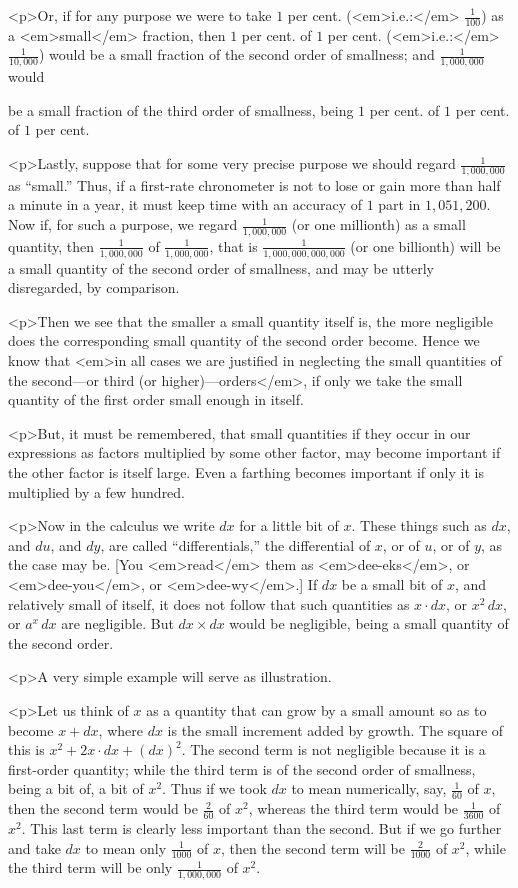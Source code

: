 \documentclass{ximera}
\begin{document}
<p>Or, if for any purpose we were to take $1$ per cent. (<em>i.e.:</em> $\frac{1}{100}$) as a <em>small</em> fraction, then $1$ per cent. of
$1$ per cent. (<em>i.e.:</em> $\frac{1}{10,000}$) would be a small fraction
of the second order of smallness; and $\frac{1}{1,000,000}$ would

be a small fraction of the third order of smallness,
being $1$ per cent. of $1$ per cent. of $1$ per cent.

<p>Lastly, suppose that for some very precise purpose
we should regard $\frac{1}{1,000,000}$ as “small.” Thus, if a
first-rate chronometer is not to lose or gain more than
half a minute in a year, it must keep time with an
accuracy of $1$ part in $1,051,200$. Now if, for such a
purpose, we regard $\frac{1}{1,000,000}$ (or one millionth) as a
small quantity, then $\frac{1}{1,000,000}$ of $\frac{1}{1,000,000}$, that is
$\frac{1}{1,000,000,000,000}$ (or one billionth) will be a small
quantity of the second order of smallness, and may
be utterly disregarded, by comparison.

<p>Then we see that the smaller a small quantity itself
is, the more negligible does the corresponding small
quantity of the second order become. Hence we
know that <em>in all cases we are justified in neglecting
the small quantities of the second---or third (or
higher)---orders</em>, if only we take the small quantity
of the first order small enough in itself.

<p>But, it must be remembered, that small quantities
if they occur in our expressions as factors multiplied
by some other factor, may become important if the
other factor is itself large. Even a farthing becomes
important if only it is multiplied by a few hundred.

<p>Now in the calculus we write $dx$ for a little bit
of $x$. These things such as $dx$, and $du$, and $dy$, are
called “differentials,” the differential of $x$, or of $u$,
or of $y$, as the case may be. [You <em>read</em> them as
<em>dee-eks</em>, or <em>dee-you</em>, or <em>dee-wy</em>.] If $dx$ be a small bit
of $x$, and relatively small of itself, it does not follow
that such quantities as $x · dx$, or $x^2\, dx$, or $a^x\, dx$ are
negligible. But $dx × dx$ would be negligible, being a
small quantity of the second order.

<p>A very simple example will serve as illustration.

<p>Let us think of $x$ as a quantity that can grow by
a small amount so as to become $x + dx$, where $dx$ is
the small increment added by growth. The square
of this is $x^2 + 2x · dx + (dx)^2$. The second term is
not negligible because it is a first-order quantity;
while the third term is of the second order of smallness,
being a bit of,
a bit of $x^2$. Thus if we took
$dx$ to mean numerically, say, $\frac{1}{60}$ of $x$, then the second
term would be $\frac{2}{60}$ of $x^2$, whereas the third term would
be $\frac{1}{3600}$ of $x^2$. This last term is clearly less important
than the second. But if we go further and take
$dx$ to mean only $\frac{1}{1000}$ of $x$, then the second term
will be $\frac{2}{1000}$ of $x^2$, while the third term will be
only $\frac{1}{1,000,000}$ of $x^2$.
\end{document}
